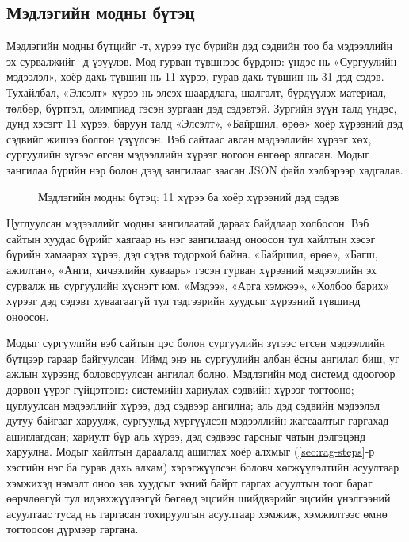 \subsection{Мэдлэгийн модны бүтэц}

Мэдлэгийн модны бүтцийг -т, хүрээ тус бүрийн дэд сэдвийн тоо ба мэдээллийн эх сурвалжийг -д үзүүлэв. Мод гурван түвшнээс бүрдэнэ: үндэс нь «Сургуулийн мэдээлэл», хоёр дахь түвшин нь 11 хүрээ, гурав дахь түвшин нь 31 дэд сэдэв. Тухайлбал, «Элсэлт» хүрээ нь элсэх шаардлага, шалгалт, бүрдүүлэх материал, төлбөр, бүртгэл, олимпиад гэсэн зургаан дэд сэдэвтэй. Зургийн зүүн талд үндэс, дунд хэсэгт 11 хүрээ, баруун талд «Элсэлт», «Байршил, өрөө» хоёр хүрээний дэд сэдвийг жишээ болгон үзүүлсэн. Вэб сайтаас авсан мэдээллийн хүрээг хөх, сургуулийн зүгээс өгсөн мэдээллийн хүрээг ногоон өнгөөр ялгасан. Модыг зангилаа бүрийн нэр болон дээд зангилааг заасан JSON файл хэлбэрээр хадгалав.

\begin{figure}[ht]
\centering
{}
\caption{Мэдлэгийн модны бүтэц: 11 хүрээ ба хоёр хүрээний дэд сэдэв}
\label{fig:tree}
\end{figure}

Цуглуулсан мэдээллийг модны зангилаатай дараах байдлаар холбосон. Вэб сайтын хуудас бүрийг хаягаар нь нэг зангилаанд оноосон тул хайлтын хэсэг бүрийн хамаарах хүрээ, дэд сэдэв тодорхой байна. «Байршил, өрөө», «Багш, ажилтан», «Анги, хичээлийн хуваарь» гэсэн гурван хүрээний мэдээллийн эх сурвалж нь сургуулийн хүснэгт юм. «Мэдээ», «Арга хэмжээ», «Холбоо барих» хүрээг дэд сэдэвт хуваагаагүй тул тэдгээрийн хуудсыг хүрээний түвшинд оноосон.

Модыг сургуулийн вэб сайтын цэс болон сургуулийн зүгээс өгсөн мэдээллийн бүтцээр гараар байгуулсан. Иймд энэ нь сургуулийн албан ёсны ангилал биш, уг ажлын хүрээнд боловсруулсан ангилал болно. Мэдлэгийн мод системд одоогоор дөрвөн үүрэг гүйцэтгэнэ: системийн хариулах сэдвийн хүрээг тогтооно; цуглуулсан мэдээллийг хүрээ, дэд сэдвээр ангилна; аль дэд сэдвийн мэдээлэл дутуу байгааг харуулж, сургуульд хүргүүлсэн мэдээллийн жагсаалтыг гаргахад ашиглагдсан; хариулт бүр аль хүрээ, дэд сэдвээс гарсныг чатын дэлгэцэнд харуулна. Модыг хайлтын дараалалд ашиглах хоёр алхмыг (\ref{sec:rag-steps}-р хэсгийн нэг ба гурав дахь алхам) хэрэгжүүлсэн боловч хөгжүүлэлтийн асуултаар хэмжихэд нэмэлт оноо зөв хуудсыг эхний байрт гаргах асуултын тоог бараг өөрчлөөгүй тул идэвхжүүлээгүй бөгөөд эцсийн шийдвэрийг эцсийн үнэлгээний асуултаас тусад нь гаргасан тохируулгын асуултаар хэмжиж, хэмжилтээс өмнө тогтоосон дүрмээр гаргана.

